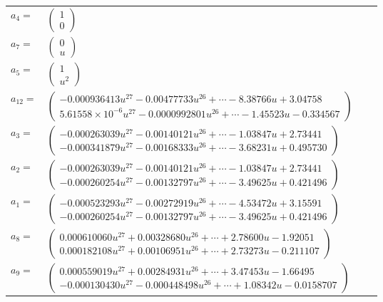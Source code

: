 \documentclass[1p]{elsarticle_modified}
\theoremstyle{definition}
\begin{document}
\begin{tabular}{m{7pt} m{180pt} m{7pt} m{180pt} }
\flushright $a_{4}=$&$\begin{pmatrix}1\\0\end{pmatrix}$ \\
\flushright $a_{7}=$&$\begin{pmatrix}0\\u\end{pmatrix}$ \\
\flushright $a_{5}=$&$\begin{pmatrix}1\\u^2\end{pmatrix}$ \\
\flushright $a_{12}=$&$\begin{pmatrix}-0.000936413 u^{27}-0.00477733 u^{26}+\cdots-8.38766 u+3.04758\\5.61558\times10^{-6} u^{27}-0.0000992801 u^{26}+\cdots-1.45523 u-0.334567\end{pmatrix}$ \\
\flushright $a_{3}=$&$\begin{pmatrix}-0.000263039 u^{27}-0.00140121 u^{26}+\cdots-1.03847 u+2.73441\\-0.000341879 u^{27}-0.00168333 u^{26}+\cdots-3.68231 u+0.495730\end{pmatrix}$ \\
\flushright $a_{2}=$&$\begin{pmatrix}-0.000263039 u^{27}-0.00140121 u^{26}+\cdots-1.03847 u+2.73441\\-0.000260254 u^{27}-0.00132797 u^{26}+\cdots-3.49625 u+0.421496\end{pmatrix}$ \\
\flushright $a_{1}=$&$\begin{pmatrix}-0.000523293 u^{27}-0.00272919 u^{26}+\cdots-4.53472 u+3.15591\\-0.000260254 u^{27}-0.00132797 u^{26}+\cdots-3.49625 u+0.421496\end{pmatrix}$ \\
\flushright $a_{8}=$&$\begin{pmatrix}0.000610060 u^{27}+0.00328680 u^{26}+\cdots+2.78600 u-1.92051\\0.000182108 u^{27}+0.00106951 u^{26}+\cdots+2.73273 u-0.211107\end{pmatrix}$ \\
\flushright $a_{9}=$&$\begin{pmatrix}0.000559019 u^{27}+0.00284931 u^{26}+\cdots+3.47453 u-1.66495\\-0.000130430 u^{27}-0.000448498 u^{26}+\cdots+1.08342 u-0.0158707\end{pmatrix}$ \\

\end{tabular}
\end{document}
